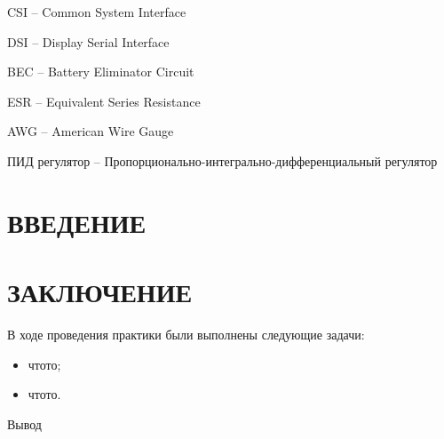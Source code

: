\documentclass[a4paper,12pt]{article}
\begin{document}
CSI -- Common System Interface

DSI -- Display Serial Interface

BEC -- Battery Eliminator Circuit

ESR -- Equivalent Series Resistance

AWG -- American Wire Gauge

ПИД регулятор -- Пропорционально-интегрально-дифференциальный регулятор

\pagebreak
\thispagestyle{empty}

\tableofcontents
\thispagestyle{empty}
\pagebreak

\section*{\centering ВВЕДЕНИЕ}
\setcounter{page}{3}
\pagebreak
\pagebreak
\pagebreak
\pagebreak
\pagebreak

\section*{\centering ЗАКЛЮЧЕНИЕ}
В ходе проведения практики были выполнены следующие задачи:
\begin{itemize} 
	\item чтото;
	\item чтото.
\end{itemize}

Вывод

\pagebreak

\printbibliography

\pagebreak
\end{document}
